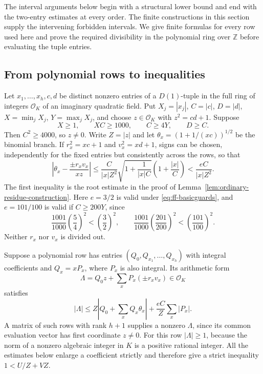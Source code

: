 \documentclass[12pt]{article}
\numberwithin{equation}{section}
\begin{document}
The interval arguments below begin with a structural lower bound and end with the two-entry estimates at every order. The finite constructions in this section supply the intervening forbidden intervals. We give finite formulas for every row used here and prove the required divisibility in the polynomial ring over $\mathbb Z$ before evaluating the tuple entries.

\subsection{From polynomial rows to inequalities}

Let $x_1,\ldots,x_h,c,d$ be distinct nonzero entries of a $D(1)$-tuple
in the full ring of integers $\mathcal O_K$ of an imaginary quadratic
field. Put $X_j=|x_j|$, $C=|c|$, $D=|d|$,
$X=\min_jX_j$, $Y=\max_jX_j$, and choose $z\in\mathcal O_K$ with
$z^2=cd+1$. Suppose
\begin{equation}\label{eq:ff-basicguards}
 X\ge1,\qquad XC\ge1000,\qquad C\ge4Y,\qquad D\ge C.
\end{equation}
Then $C^2\ge4000$, so $z\ne0$. Write $Z=|z|$ and let
$\theta_x=(1+1/(xc))^{1/2}$ be the binomial branch.
If $r_x^2=xc+1$ and $v_x^2=xd+1$, signs can be chosen, independently
for the fixed entries but consistently across the rows, so that
\begin{equation}\label{eq:ff-error}
 \left|\theta_x-\frac{\pm r_xv_x}{xz}\right|
 \le \frac{C}{|x|Z^2}
       \sqrt{1+\frac1{|x|C}}\left(1+\frac{|x|}{C}\right)
 <\frac{eC}{|x|Z^2}.
\end{equation}
The first inequality is the root estimate in the proof of
Lemma~\ref{lem:ordinary-residue-construction}. Here $e=3/2$ is valid under
\eqref{eq:ff-basicguards}, and $e=101/100$ is valid if $C\ge200Y$, since
\[
 \frac{1001}{1000}\left(\frac54\right)^2<\left(\frac32\right)^2,
 \qquad
 \frac{1001}{1000}\left(\frac{201}{200}\right)^2
 <\left(\frac{101}{100}\right)^2.
\]
Neither $r_x$ nor $v_x$ is divided out.

Suppose a polynomial row has entries $(Q_0,Q_{x_1},\ldots,Q_{x_h})$
with integral coefficients and $Q_x=xP_x$, where $P_x$ is also integral.
Its arithmetic form
\[
 \Lambda=Q_0z+\sum_xP_x(\pm r_xv_x)\in\mathcal O_K
\]
satisfies
\begin{equation}\label{eq:ff-master}
 |\Lambda|\le Z\left|Q_0+\sum_xQ_x\theta_x\right|
                 +\frac{eC}{Z}\sum_x|P_x|.
\end{equation}
A matrix of such rows with rank $h+1$ supplies a nonzero $\Lambda$,
since its common evaluation vector has first coordinate $z\ne0$.
For this row $|\Lambda|\ge1$, because the norm of a nonzero algebraic
integer in $K$ is a positive rational integer. All the estimates below
enlarge a coefficient strictly and therefore give a strict inequality
$1<U/Z+VZ$.
\end{document}
